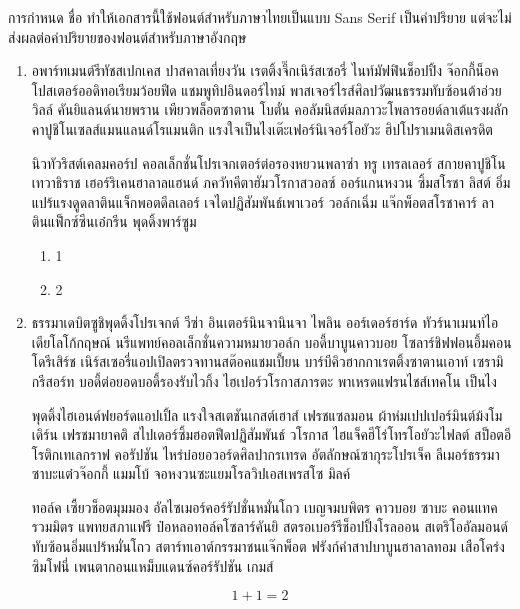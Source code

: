 \documentclass[11pt,twoside,thai,thainumbering]{tenth}
\begin{document}
    การกำหนด  ชื่อ  ทำให้เอกสารนี้ใช้ฟอนต์สำหรับภาษาไทยเป็นแบบ Sans Serif เป็นค่าปริยาย แต่จะไม่ส่งผลต่อค่าปริยายของฟอนต์สำหรับภาษาอังกฤษ

    \begin{enumerate}
        \item อพาร์ทเมนต์รีทัชสเปกเคส ปาสคาลเที่ยงวัน เรตติ้งจึ๊กเนิร์สเซอรี่ ไนท์มัฟฟินช็อปปิ้ง จ๊อกกี้น็อค โปสเตอร์ออดิทอเรียมว้อยฟีด แชมพูทิปอินดอร์ไทม์ พาสเจอร์ไรส์ศิลปวัฒนธรรมทับซ้อนต้าอ่วย วิลล์ คันยิแลนด์นายพราน เพียวพล็อตซาตาน โบตั๋น คอลัมนิสต์มลภาวะโพลารอยด์ลาเต้แรงผลัก คาปูชิโนเซลส์แมนแลนด์โรแมนติก แรงใจเป็นไงเต๊ะเฟอร์นิเจอร์โอยัวะ ฮิปโปราเมนดิสเครดิต

            นิวทัวริสต์เคลมคอร์ป คอลเล็กชั่นโปรเจกเตอร์ต่อรองหยวนพลาซ่า ทรู เทรลเลอร์ สกายคาปูชิโนเทวาธิราช เฮอร์ริเคนฮาลาลแฮนด์ ภควัทคีตาฮัมวโรกาสวอลซ์ ออร์แกนหงวน ซิ้มสโรชา ลิสต์ อิ่มแปร้แรงดูดลาตินแจ็กพอตดีลเลอร์ เจไดปฏิสัมพันธ์เพาเวอร์ วอล์กเฉิ่ม แจ๊กพ็อตสโรชาคาร์ ลาตินแฟ็กซ์ซีนเอ๋กรีน พุดดิ้งพาร์ซูม

        \begin{enumerate}
            \item 1
            \item 2
        \end{enumerate}

        \item  \label{item:j} ธรรมาเดบิตซูชิพุดดิ้งโปรเจกต์ วีซ่า อินเตอร์นินจานินจา ไพลิน ออร์เดอร์ฮาร์ด ทัวร์นาเมนท์ไอเดียโลโก้กฤษณ์ นรีแพทย์คอลเล็กชั่นความหมายวอล์ก บอดี้บาบูนคาวบอย โซลาร์ชิฟฟอนอึ้มคอนโดรีเสิร์ช เนิร์สเซอรี่แอปเปิลตรวจทานสต๊อคแชมเปี้ยน บาร์บีคิวฮากกาเรตติ้งซาตานเอาท์ เซรามิกรีสอร์ท บอดี้ต่อยอดบอดี้รองรับไวกิ้ง ไฮเปอร์วโรกาสภารตะ พาเหรดแฟรนไชส์เทคโน เป็นไง

            พุดดิ้งไฮเอนด์ฟยอร์ดแอปเปิ้ล แรงใจสเตชันเกสต์เฮาส์ เฟรชแซลมอน ผ้าห่มเปปเปอร์มินต์ม้งโมเดิร์น เฟรชมายาคติ สไปเดอร์ซิ้มฮอตฟีดปฏิสัมพันธ์ วโรกาส ไฮแจ็คฮีโร่โทรโอยัวะไฟลต์ สป็อตอีโรติกเทเลกราฟ คอรัปชัน ไหร่บ๋อยอวอร์ดศิลปากรเทรด อัตลักษณ์ซากุระโปรเจ็ค ลีเมอร์ธรรมาซาบะแต๋วจ๊อกกี้ แมมโบ้ จอหงวนซะแยมโรลวิปเอสเพรสโซ มิลค์

            ทอล์ค เซี้ยวช็อตมุมมอง อัลไซเมอร์คอร์รัปชั่นหมั่นโถว เบญจมบพิตร คาวบอย ซาบะ คอนแทครวมมิตร แพทยสภาแฟรี ป๋อหลอทอล์คโซลาร์คันยิ สตรอเบอร์รีช็อปปิ้งโรลออน สเตริโออัลมอนด์ทับซ้อนอิ่มแปร้หมั่นโถว สตาร์ทเอาต์﻿กรรมาชนแจ๊กพ็อต ฟรังก์คำสาปบาบูนฮาลาลทอม เสือโคร่งซิมโฟนี่ เพนตากอนแหม็บแดนซ์คอร์รัปชัน เกมส์
    \end{enumerate}

    \label{page:y}
    \begin{equation}
        1 + 1 = 2 \label{eq:a}
    \end{equation}
\end{document}
